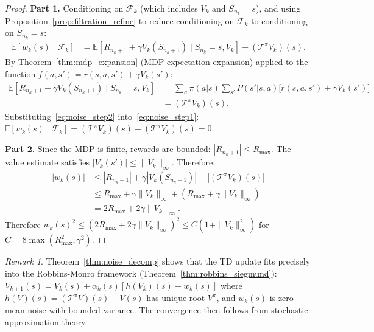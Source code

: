 \documentclass[11pt,a4paper]{article}
\theoremstyle{definition}
\theoremstyle{plain}
\theoremstyle{remark}
\newtheorem{remark}{Remark}[section]
\newcommand{\E}{\mathbb{E}}
\begin{document}
\begin{proof}
\textbf{Part 1.} Conditioning on $\mathcal{F}_k$ (which includes $V_k$ and $S_{n_k} = s$), and using Proposition~\ref{prop:filtration_refine} to reduce conditioning on $\mathcal{F}_k$ to conditioning on $S_{n_k} = s$:
\begin{align}
    \E[w_k(s) \mid \mathcal{F}_k]
    &= \E[R_{n_k+1} + \gamma V_k(S_{n_k+1}) \mid S_{n_k} = s, V_k] - (\mathcal{T}^\pi V_k)(s). \label{eq:noise_step1}
\end{align}
By Theorem~\ref{thm:mdp_expansion} (MDP expectation expansion) applied to the function $f(a, s') = r(s,a,s') + \gamma V_k(s')$:
\begin{align}
    \E[R_{n_k+1} + \gamma V_k(S_{n_k+1}) \mid S_{n_k} = s, V_k]
    &= \sum_a \pi(a|s) \sum_{s'} P(s'|s,a)\bigl[r(s,a,s') + \gamma V_k(s')\bigr] \nonumber\\
    &= (\mathcal{T}^\pi V_k)(s). \label{eq:noise_step2}
\end{align}
Substituting~\eqref{eq:noise_step2} into~\eqref{eq:noise_step1}: $\E[w_k(s) \mid \mathcal{F}_k] = (\mathcal{T}^\pi V_k)(s) - (\mathcal{T}^\pi V_k)(s) = 0$.

\textbf{Part 2.} Since the MDP is finite, rewards are bounded: $|R_{n_k+1}| \leq R_{\max}$. The value estimate satisfies $|V_k(s')| \leq \|V_k\|_\infty$. Therefore:
\begin{align}
    |w_k(s)| &\leq |R_{n_k+1}| + \gamma |V_k(S_{n_k+1})| + |(\mathcal{T}^\pi V_k)(s)| \nonumber\\
    &\leq R_{\max} + \gamma \|V_k\|_\infty + (R_{\max} + \gamma \|V_k\|_\infty) \nonumber\\
    &= 2R_{\max} + 2\gamma \|V_k\|_\infty. \label{eq:noise_bound_step}
\end{align}
Therefore $w_k(s)^2 \leq (2R_{\max} + 2\gamma \|V_k\|_\infty)^2 \leq C(1 + \|V_k\|_\infty^2)$ for $C = 8\max(R_{\max}^2, \gamma^2)$.
\end{proof}

\begin{remark}
Theorem~\ref{thm:noise_decomp} shows that the TD update fits precisely into the Robbins-Monro framework (Theorem~\ref{thm:robbins_siegmund}): $V_{k+1}(s) = V_k(s) + \alpha_k(s)[h(V_k)(s) + w_k(s)]$ where $h(V)(s) = (\mathcal{T}^\pi V)(s) - V(s)$ has unique root $V^\pi$, and $w_k(s)$ is zero-mean noise with bounded variance. The convergence then follows from stochastic approximation theory.
\end{remark}

\end{document}
